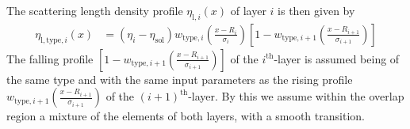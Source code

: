 The scattering length density profile $\eta_{\mathrm{l},i}(x)$ of layer $i$ is then given by
\begin{align} \label{eq:thinlayersprofile}
  \eta_{\mathrm{l,type},i}(x) &=  \left(\eta_i-\eta_\mathrm{sol}\right) w_{\mathrm{type},i}\left(\frac{x-R_{i}}{\sigma_{i}}\right)  \left[1- w_{\mathrm{type},i+1}\left(\frac{x-R_{i+1}}{\sigma_{i+1}}\right)\right]
\end{align}
The falling profile $\left[1- w_{\mathrm{type},i+1}\left(\frac{x-R_{i+1}}{\sigma_{i+1}}\right)\right]$ of the $i^\mathrm{th}$-layer is assumed being of the same type and with the same input parameters as the rising profile $w_{\mathrm{type},i+1}\left(\frac{x-R_{i+1}}{\sigma_{i+1}}\right)$ of the $(i+1)^\mathrm{th}$-layer. By this we assume within the overlap region a mixture of the elements of both layers, with a smooth transition.

